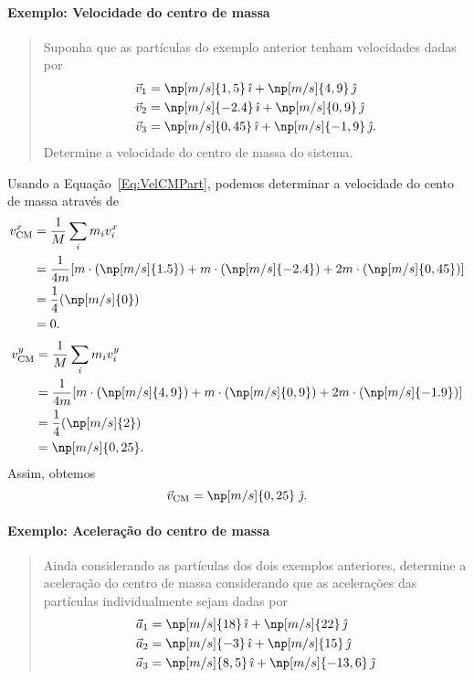 \paragraph{Exemplo: Velocidade do centro de massa}

\begin{quote}
    Suponha que as partículas do exemplo anterior tenham velocidades dadas por
    \begin{align}
        \vec{v}_1 &= \np[m/s]{1,5} \, \versi + \np[m/s]{4,9} \, \versj \\
        \vec{v}_2 &= \np[m/s]{-2.4} \, \versi + \np[m/s]{0,9} \, \versj \\
        \vec{v}_3 &= \np[m/s]{0,45} \, \versi + \np[m/s]{-1,9} \, \versj.
    \end{align}
Determine a velocidade do centro de massa do sistema.
\end{quote}

Usando a Equação~\ref{Eq:VelCMPart}, podemos determinar a velocidade do cento de massa através de
\begin{align}
    v^x_{\rm{CM}} &= \frac{1}{M} \sum_{i} m_i v^x_i \\
    &= \frac{1}{4m} [m\cdot(\np[m/s]{1.5}) + m\cdot(\np[m/s]{-2.4}) + 2m\cdot(\np[m/s]{0,45})] \\
    &= \frac{1}{4} (\np[m/s]{0}) \\
    &= 0.
\end{align}
%
\begin{align}
    v^y_{\rm{CM}} &= \frac{1}{M} \sum_{i} m_i v^y_i \\
    &= \frac{1}{4m} [m\cdot(\np[m/s]{4,9}) + m\cdot(\np[m/s]{0,9}) + 2m\cdot(\np[m/s]{-1.9})] \\
    &= \frac{1}{4} (\np[m/s]{2}) \\
    &= \np[m/s]{0,25}.
\end{align}
%
Assim, obtemos
\begin{equation}
    \vec{v}_{\text{CM}} = \np[m/s]{0,25} \; \versj.
\end{equation}

\paragraph{Exemplo: Aceleração do centro de massa}

\begin{quote}
    Ainda considerando as partículas dos dois exemplos anteriores, determine a aceleração do centro de massa considerando que as acelerações das partículas individualmente sejam dadas por
\begin{align}
    \vec{a}_1 &= \np[m/s]{18} \, \versi + \np[m/s]{22} \, \versj \\
    \vec{a}_2 &= \np[m/s]{-3} \, \versi + \np[m/s]{15} \, \versj \\
    \vec{a}_3 &= \np[m/s]{8,5} \, \versi + \np[m/s]{-13,6} \, \versj
\end{align}
\end{quote}

